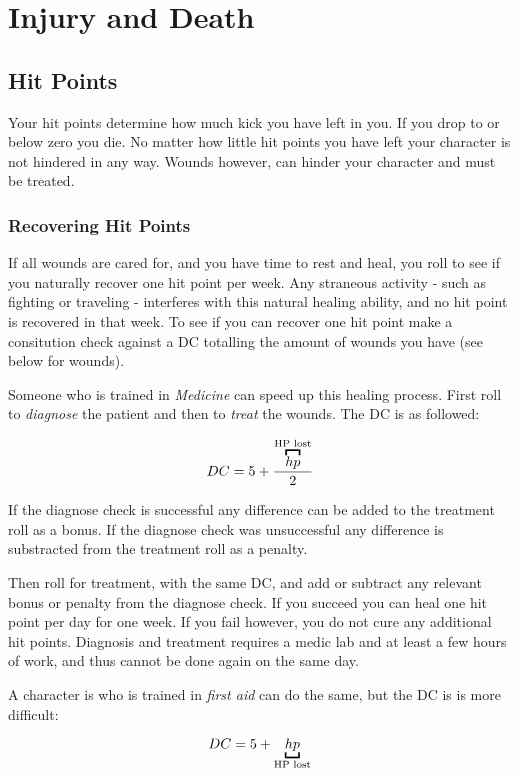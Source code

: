 \chapter{Injury and Death}

\section{Hit Points}
\label{sec:hp}

Your hit points determine how much kick you have left in you. If you drop to or
below zero you die. No matter how little hit points you have left your character
is not hindered in any way. Wounds however, can hinder your character and must
be treated.

\subsection{Recovering Hit Points}
\label{sub:recoverhp}

If all wounds are cared for, and you have time to rest and heal, you roll to
see if you naturally recover one hit point per week. Any straneous activity -
such as fighting or traveling - interferes with this natural healing ability,
and no hit point is recovered in that week. To see if you can recover one hit
point make a consitution check against a DC totalling the amount of wounds you
have (see below for wounds).

Someone who is trained in \emph{Medicine} can speed up this healing process.
First roll to \emph{diagnose} the patient and then to \emph{treat} the wounds.
The DC is as followed:

\[
DC = 5 + \frac{\ob{hp}{HP lost}}{2}
\]

If the diagnose check is successful any difference can be added to the treatment
roll as a bonus. If the diagnose check was unsuccessful any difference is
substracted from the treatment roll as a penalty.

Then roll for treatment, with the same DC, and add or subtract any relevant
bonus or penalty from the diagnose check. If you succeed you can heal one hit
point per day for one week. If you fail however, you do not cure any additional
hit points. Diagnosis and treatment requires a medic lab and at least a few
hours of work, and thus cannot be done again on the same day.

A character is who is trained in \emph{first aid} can do the same, but the DC is
is more difficult:

\[
DC = 5 + \ub{hp}{HP lost}
\]

